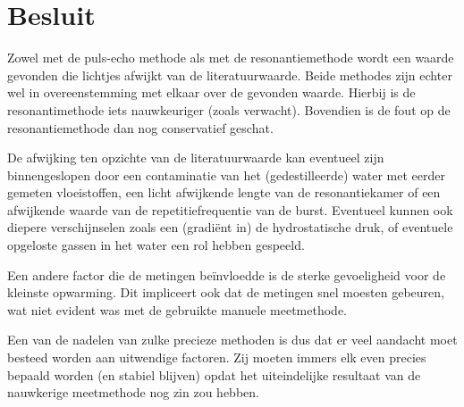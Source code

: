\section{Besluit}
Zowel met de puls-echo methode als met de resonantiemethode wordt een 
waarde gevonden die lichtjes afwijkt van de literatuurwaarde. Beide 
methodes zijn echter wel in overeenstemming met elkaar over de gevonden 
waarde.  Hierbij is de resonantimethode iets nauwkeuriger (zoals verwacht). 
Bovendien is de fout op de resonantiemethode dan nog conservatief geschat.

De afwijking ten opzichte van de literatuurwaarde kan eventueel zijn 
binnengeslopen door een contaminatie van het (gedestilleerde) water met 
eerder gemeten vloeistoffen, een licht afwijkende lengte van de 
resonantiekamer of een afwijkende waarde van de repetitiefrequentie van de 
burst. Eventueel kunnen ook diepere verschijnselen zoals een (gradi\"ent 
in) de hydrostatische druk, of eventuele opgeloste gassen in het water een 
rol hebben gespeeld.

Een andere factor die de metingen be\"invloedde is de sterke gevoeligheid 
voor de kleinste opwarming. Dit impliceert ook dat de metingen snel moesten 
gebeuren, wat niet evident was met de gebruikte manuele meetmethode.

Een van de nadelen van zulke precieze methoden is dus dat er veel aandacht 
moet besteed worden aan uitwendige factoren. Zij moeten immers elk even 
precies bepaald worden (en stabiel blijven) opdat het uiteindelijke 
resultaat van de nauwkerige meetmethode nog zin zou hebben.
